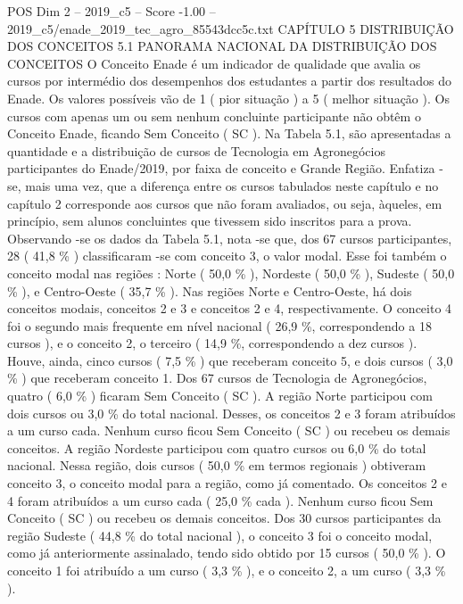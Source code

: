 \begin{textsample}{POS Dim 2 – 2019\_c5 – Score -1.00 – 2019\_c5/enade\_2019\_tec\_agro\_85543dcc5c.txt}  \label{ex:f2_pos_342}
CAPÍTULO 5 DISTRIBUIÇÃO DOS CONCEITOS 5.1 PANORAMA NACIONAL DA DISTRIBUIÇÃO DOS CONCEITOS O Conceito Enade é um indicador de qualidade que avalia os cursos por intermédio dos desempenhos dos estudantes a partir dos resultados do Enade.
Os valores possíveis vão de 1 ( pior situação ) a 5 ( melhor situação ).
Os cursos com apenas um ou sem nenhum concluinte participante não obtêm o Conceito Enade, ficando Sem Conceito ( SC ).
Na Tabela 5.1, são apresentadas a quantidade e a distribuição de cursos de Tecnologia em Agronegócios participantes do Enade/2019, por faixa de conceito e Grande Região.
Enfatiza -se, mais uma vez, que a diferença entre os cursos tabulados neste capítulo e no capítulo 2 corresponde aos cursos que não foram avaliados, ou seja, àqueles, em princípio, sem alunos concluintes que tivessem sido inscritos para a prova.
Observando -se os dados da Tabela 5.1, nota -se que, dos 67 cursos participantes, 28 ( 41,8 \% ) classificaram -se com conceito 3, o valor modal.
Esse foi também o conceito modal nas regiões : Norte ( 50,0 \% ), Nordeste ( 50,0 \% ), Sudeste ( 50,0 \% ), e Centro-Oeste ( 35,7 \% ).
Nas regiões Norte e Centro-Oeste, há dois conceitos modais, conceitos 2 e 3 e conceitos 2 e 4, respectivamente.
O conceito 4 foi o segundo mais frequente em nível nacional ( 26,9 \%, correspondendo a 18 cursos ), e o conceito 2, o terceiro ( 14,9 \%, correspondendo a dez cursos ).
Houve, ainda, cinco cursos ( 7,5 \% ) que receberam conceito 5, e dois cursos ( 3,0 \% ) que receberam conceito 1.
Dos 67 cursos de Tecnologia de Agronegócios, quatro ( 6,0 \% ) ficaram Sem Conceito ( SC ).
A região Norte participou com dois cursos ou 3,0 \% do total nacional.
Desses, os conceitos 2 e 3 foram atribuídos a um curso cada.
Nenhum curso ficou Sem Conceito ( SC ) ou recebeu os demais conceitos.
A região Nordeste participou com quatro cursos ou 6,0 \% do total nacional.
Nessa região, dois cursos ( 50,0 \% em termos regionais ) obtiveram conceito 3, o conceito modal para a região, como já comentado.
Os conceitos 2 e 4 foram atribuídos a um curso cada ( 25,0 \% cada ).
Nenhum curso ficou Sem Conceito ( SC ) ou recebeu os demais conceitos.
Dos 30 cursos participantes da região Sudeste ( 44,8 \% do total nacional ), o conceito 3 foi o conceito modal, como já anteriormente assinalado, tendo sido obtido por 15 cursos ( 50,0 \% ).
O conceito 1 foi atribuído a um curso ( 3,3 \% ), e o conceito 2, a um curso ( 3,3 \% ).

\end{textsample}
